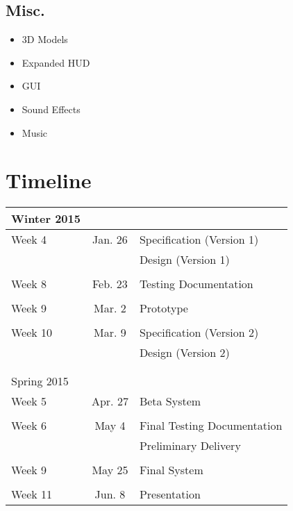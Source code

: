 \subsection{Misc.}

\begin{itemize}
	\item 3D Models
	\item Expanded HUD
	\item GUI
	\item Sound Effects
	\item Music
\end{itemize}

\section{Timeline}

\begin{table}[h]
\centering
\begin{tabular}{l  c  l}
	\hline
	Winter 2015\\
	\hline
	Week 4	&	Jan. 26	&	Specification (Version 1)\\
			&			&	Design (Version 1)\\\\
	Week 8	&	Feb. 23	&	Testing Documentation\\\\
	Week 9	&	Mar. 2	&	Prototype\\\\
	Week 10	&	Mar. 9	&	Specification (Version 2)\\
			&			&	Design (Version 2)\\\\\\
	\hline
	Spring 2015\\
	\hline
	Week 5	&	Apr. 27	&	Beta System\\\\
	Week 6	&	May 4	&	Final Testing Documentation\\
			&			&	Preliminary Delivery\\\\
	Week 9	&	May 25	&	Final System\\\\
	Week 11	&	Jun. 8	&	Presentation
\end{tabular}
\end{table}

